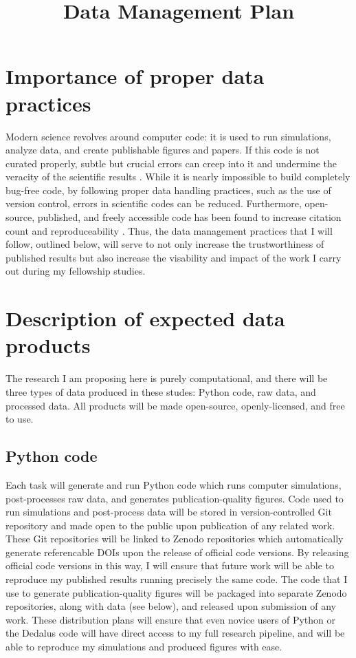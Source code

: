 \documentclass[11pt, preprint]{aastex}
\begin{document}
\title{Data Management Plan}
\maketitle
\thispagestyle{fancy}

\section{Importance of proper data practices}
Modern science revolves around computer code: it is used to run simulations, analyze data, and create publishable figures and papers.
If this code is not curated properly, subtle but crucial errors can creep into it and undermine the veracity of the scientific results \citep{soergel2015}.
While it is nearly impossible to build completely bug-free code, by following proper data handling practices, such as the use of version control, errors in scientific codes can be reduced.
Furthermore, open-source, published, and freely accessible code has been found to increase citation count and reproduceability \citep{piwowar&vision2013}.
Thus, the data management practices that I will follow, outlined below, will serve to not only increase the trustworthiness of published results but also increase the visability and impact of the work I carry out during my fellowship studies.

\section{Description of expected data products}
The research I am proposing here is purely computational, and there will be three types of data produced in these studes: Python code, raw data, and processed data.
All products will be made open-source, openly-licensed, and free to use.

\subsection{Python code}
Each task will generate and run Python code which runs computer simulations, post-processes raw data, and generates publication-quality figures.
Code used to run simulations and post-process data will be stored in version-controlled Git repository and made open to the public upon publication of any related work.
These Git repositories will be linked to Zenodo repositories which automatically generate referencable DOIs upon the release of official code versions.
By releasing official code versions in this way, I will ensure that future work will be able to reproduce my published results running precisely the same code.
The code that I use to generate publication-quality figures will be packaged into separate Zenodo repositories, along with data (see below), and released upon submission of any work.
These distribution plans will ensure that even novice users of Python or the Dedalus code will have direct access to my full research pipeline, and will be able to reproduce my simulations and produced figures with ease.
\end{document}
